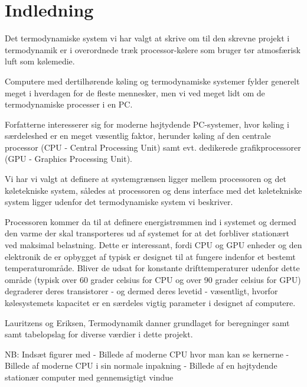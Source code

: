 \section{Indledning}

Det termodynamiske system vi har valgt at skrive om til den skrevne projekt i termodynamik er i overordnede træk processor-kølere som bruger tør atmosfærisk luft som kølemedie.

Computere med dertilhørende køling og termodynamiske systemer fylder generelt meget i hverdagen for de fleste mennesker, men vi ved meget lidt om de termodynamiske processer i en PC.

Forfatterne interesserer sig for moderne højtydende PC-systemer, hvor køling i særdeleshed er en meget væsentlig faktor, herunder køling af den centrale processor (CPU - Central Processing Unit) samt evt. dedikerede grafikprocessorer (GPU - Graphics Processing Unit).

Vi har vi valgt at definere at systemgrænsen ligger mellem processoren og det køletekniske system, således at processoren og dens interface med det køletekniske system ligger udenfor det termodynamiske system vi beskriver.

Processoren kommer da til at definere energistrømmen ind i systemet og dermed den varme der skal transporteres ud af systemet for at det forbliver stationært ved maksimal belastning. Dette er interessant, fordi CPU og GPU enheder og den elektronik de er opbygget af typisk er designet til at fungere indenfor et bestemt temperaturområde. Bliver de udsat for konstante drifttemperaturer udenfor dette område (typisk over 60 grader celsius for CPU og over 90 grader celsius for GPU) degraderer deres transistorer - og dermed deres levetid - væsentligt, hvorfor kølesystemets kapacitet er en særdeles vigtig parameter i designet af computere.

Lauritzens og Eriksen, Termodynamik danner grundlaget for beregninger samt samt tabelopslag for diverse værdier i dette projekt.

NB: Indsæt figurer med
- Billede af moderne CPU hvor man kan se kernerne
- Billede af moderne CPU i sin normale inpakning
- Billede af en højtydende stationær computer med gennemsigtigt vindue

